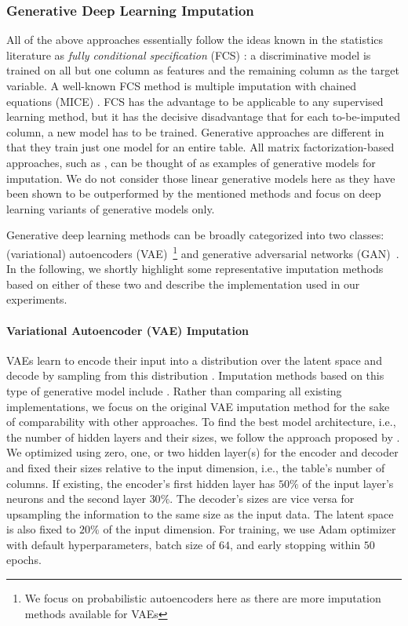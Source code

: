 \documentclass[utf8]{frontiersSCNS} %
\begin{document}
\subsubsection{Generative Deep Learning Imputation}
\label{sec:generative_imputation}
%
All of the above approaches essentially follow the ideas known in the statistics literature as {\em fully conditional specification} (FCS) \citep{vanBuuren2018}: a discriminative model is trained on all but one column as features and the remaining column as the target variable. A well-known FCS method is multiple imputation with chained equations (MICE) \citep{Little}. FCS has the advantage to be applicable to any supervised learning method, but it has the decisive disadvantage that for each to-be-imputed column, a new model has to be trained. Generative approaches are different in that they train just one model for an entire table. All matrix factorization-based approaches, such as \cite{Troyanskaya2001,Koren2009,Mazumder2010}, can be thought of as examples of generative models for imputation. We do not consider those linear generative models here as they have been shown to be outperformed by the mentioned methods and focus on deep learning variants of generative models only.

Generative deep learning methods can be broadly categorized into two classes: (variational) autoencoders (VAE)~\citep{VAE}\footnote{We focus on probabilistic autoencoders here as there are more imputation methods available for VAEs} and generative adversarial networks (GAN)~\citep{GAN}. In the following, we shortly highlight some representative imputation methods based on either of these two and describe the implementation used in our experiments.

\paragraph{Variational Autoencoder (VAE) Imputation}
%
VAEs learn to encode their input into a distribution over the latent space and decode by sampling from this distribution \citep{VAE}. Imputation methods based on this type of generative model include \cite{HIVAE, VAE_for_genomic_data, VAEM}. Rather than comparing all existing implementations, we focus on the original VAE imputation method for the sake of comparability with other approaches. To find the best model architecture, i.e., the number of hidden layers and their sizes, we follow the approach proposed by \cite{CaminoVAE}. We optimized using zero, one, or two hidden layer(s) for the encoder and decoder and fixed their sizes relative to the input dimension, i.e., the table's number of columns. If existing, the encoder's first hidden layer has $50\%$ of the input layer's neurons and the second layer $30\%$. The decoder's sizes are vice versa for upsampling the information to the same size as the input data. The latent space is also fixed to $20\%$ of the input dimension.
For training, we use Adam optimizer with default hyperparameters, batch size of $64$, and early stopping within $50$ epochs.
\end{document}
